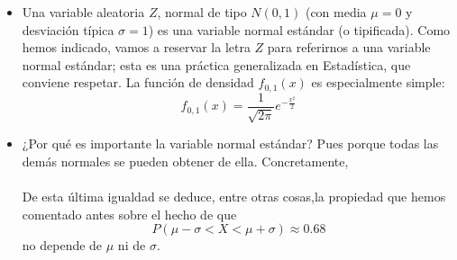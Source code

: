 \begin{itemize}

\item  Una variable aleatoria $Z$, normal de tipo $N(0,1)$ (con media $\mu=0$ y desviación típica $\sigma=1$) es una {\sf variable normal estándar (o tipificada)}. Como hemos indicado, vamos a reservar la letra $Z$ para referirnos a una variable normal estándar; esta es una práctica generalizada en Estadística, que conviene respetar. La función de densidad $f_{0,1}(x)$ es especialmente simple:
       \[f_{0,1}(x)=\dfrac{1}{\sqrt{2\pi}}e^{-\frac{x^2}{2}}\]


\item ¿Por qué es importante la variable normal estándar? Pues porque todas las demás normales se pueden obtener de ella. Concretamente,\\[3mm]
       \\[3mm]
       De esta última igualdad se deduce, entre otras cosas,la propiedad que hemos comentado antes sobre el hecho de que
       \[P(\mu-\sigma<X<\mu+\sigma)\approx 0.68\] no depende de $\mu$ ni de $\sigma$.


\end{itemize}
